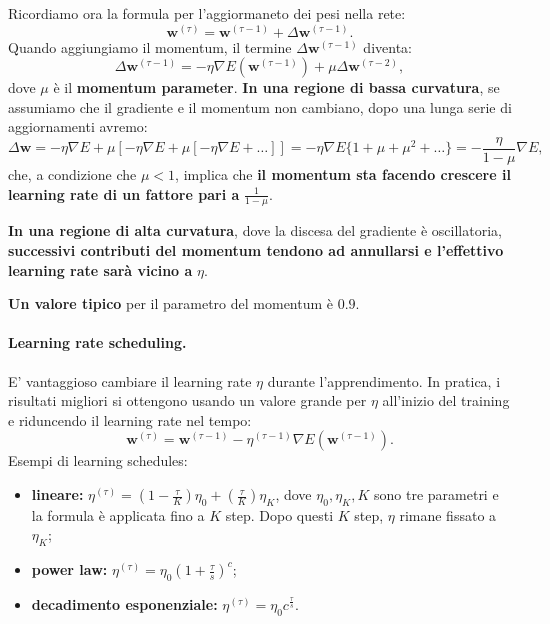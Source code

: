 Ricordiamo ora la formula per l'aggiormaneto dei pesi nella rete:
\begin{equation}
    \textbf{w}^{(\tau)}=\textbf{w}^{(\tau-1)}+\Delta\textbf{w}^{(\tau-1)}.
\end{equation}
Quando aggiungiamo il momentum, il termine $\Delta\textbf{w}^{(\tau-1)}$ diventa:
\begin{equation}
    \Delta\textbf{w}^{(\tau-1)}=-\eta\nabla E(\textbf{w}^{(\tau-1)})+\mu\Delta\textbf{w}^{(\tau-2)},
\end{equation}
dove $\mu$ è il \textbf{momentum parameter}.
\newline
\newline
\textbf{In una regione di bassa curvatura}, se assumiamo che il gradiente e il momentum non cambiano, dopo una lunga serie di aggiornamenti avremo:
\begin{equation}
    \Delta\textbf{w}=-\eta\nabla E + \mu [-\eta\nabla E + \mu[ -\eta\nabla E + \dots] ] = -\eta\nabla E\{ 1+\mu+\mu^2+\dots \}=-\frac{\eta}{1-\mu}\nabla E,
\end{equation}
che, a condizione che $\mu<1$, implica che \textbf{il momentum sta facendo crescere il learning rate di un fattore pari a} $\frac{1}{1-\mu}$.



\textbf{In una regione di alta curvatura}, dove la discesa del gradiente è oscillatoria, \textbf{successivi contributi del momentum tendono ad annullarsi e l'effettivo learning rate sarà vicino a} $\eta$.



\textbf{Un valore tipico} per il parametro del momentum è $0.9$.

\paragraph{Learning rate scheduling.} E' vantaggioso cambiare il learning rate $\eta$ durante l'apprendimento. In pratica, i risultati migliori si ottengono usando un valore grande per $\eta$ all'inizio del training e riduncendo il learning rate nel tempo:
\begin{equation}
     \textbf{w}^{(\tau)}=\textbf{w}^{(\tau-1)}-\eta^{(\tau-1)}\nabla E(\textbf{w}^{(\tau-1)}).
\end{equation}
Esempi di learning schedules:
\begin{itemize}
    \item \textbf{lineare:} $\eta^{(\tau)}=(1-\frac{\tau}{K})\eta_0+(\frac{\tau}{K})\eta_K$, dove $\eta_0, \eta_K,K$ sono tre parametri e la formula è applicata fino a $K$ step. Dopo questi $K$ step, $\eta$ rimane fissato a $\eta_K$;
    \item \textbf{power law:} $\eta^{(\tau)}=\eta_0(1+\frac{\tau}{s})^c$;
    \item \textbf{decadimento esponenziale:} $\eta^{(\tau)}=\eta_0c^{\frac{\tau}{s}}$.
\end{itemize}
\newpage
